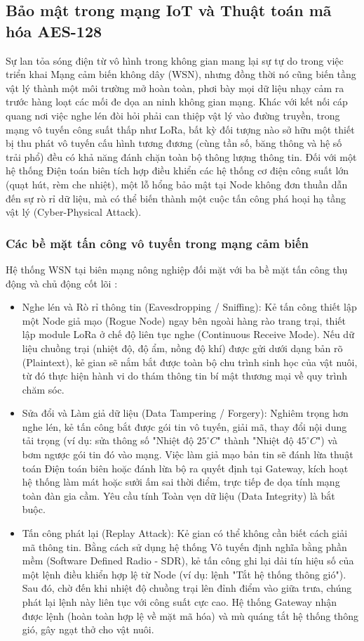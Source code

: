 \subsection{Bảo mật trong mạng IoT và Thuật toán mã hóa AES-128}
Sự lan tỏa sóng điện từ vô hình trong không gian mang lại sự tự do trong việc triển khai Mạng cảm biến không dây (WSN), nhưng đồng thời nó cũng biến tầng vật lý thành một môi trường mở hoàn toàn, phơi bày mọi dữ liệu nhạy cảm ra trước hàng loạt các mối đe dọa an ninh không gian mạng. Khác với kết nối cáp quang nơi việc nghe lén đòi hỏi phải can thiệp vật lý vào đường truyền, trong mạng vô tuyến công suất thấp như LoRa, bất kỳ đối tượng nào sở hữu một thiết bị thu phát vô tuyến cấu hình tương đương (cùng tần số, băng thông và hệ số trải phổ) đều có khả năng đánh chặn toàn bộ thông lượng thông tin. Đối với một hệ thống Điện toán biên tích hợp điều khiển các hệ thống cơ điện công suất lớn (quạt hút, rèm che nhiệt), một lỗ hổng bảo mật tại Node không đơn thuần dẫn đến sự rò rỉ dữ liệu, mà có thể biến thành một cuộc tấn công phá hoại hạ tầng vật lý (Cyber-Physical Attack).
\subsubsection{Các bề mặt tấn công vô tuyến trong mạng cảm biến}
Hệ thống WSN tại biên mạng nông nghiệp đối mặt với ba bề mặt tấn công thụ động và chủ động cốt lõi \cite{granjal2015security}:
\begin{itemize}
    \item Nghe lén và Rò rỉ thông tin (Eavesdropping / Sniffing): Kẻ tấn công thiết lập một Node giả mạo (Rogue Node) ngay bên ngoài hàng rào trang trại, thiết lập module LoRa ở chế độ liên tục nghe (Continuous Receive Mode). Nếu dữ liệu chuồng trại (nhiệt độ, độ ẩm, nồng độ khí) được gửi dưới dạng bản rõ (Plaintext), kẻ gian sẽ nắm bắt được toàn bộ chu trình sinh học của vật nuôi, từ đó thực hiện hành vi do thám thông tin bí mật thương mại về quy trình chăm sóc.
    \item Sửa đổi và Làm giả dữ liệu (Data Tampering / Forgery): Nghiêm trọng hơn nghe lén, kẻ tấn công bắt được gói tin vô tuyến, giải mã, thay đổi nội dung tải trọng (ví dụ: sửa thông số "Nhiệt độ $25^\circ C$" thành "Nhiệt độ $45^\circ C$") và bơm ngược gói tin đó vào mạng. Việc làm giả mạo bản tin sẽ đánh lừa thuật toán Điện toán biên hoặc đánh lừa bộ ra quyết định tại Gateway, kích hoạt hệ thống làm mát hoặc sưởi ấm sai thời điểm, trực tiếp đe dọa tính mạng toàn đàn gia cầm. Yêu cầu tính Toàn vẹn dữ liệu (Data Integrity) là bắt buộc.
    \item Tấn công phát lại (Replay Attack): Kẻ gian có thể không cần biết cách giải mã thông tin. Bằng cách sử dụng hệ thống Vô tuyến định nghĩa bằng phần mềm (Software Defined Radio - SDR), kẻ tấn công ghi lại dải tín hiệu số của một lệnh điều khiển hợp lệ từ Node (ví dụ: lệnh "Tắt hệ thống thông gió"). Sau đó, chờ đến khi nhiệt độ chuồng trại lên đỉnh điểm vào giữa trưa, chúng phát lại lệnh này liên tục với công suất cực cao. Hệ thống Gateway nhận được lệnh (hoàn toàn hợp lệ về mặt mã hóa) và mù quáng tắt hệ thống thông gió, gây ngạt thở cho vật nuôi.
\end{itemize}
